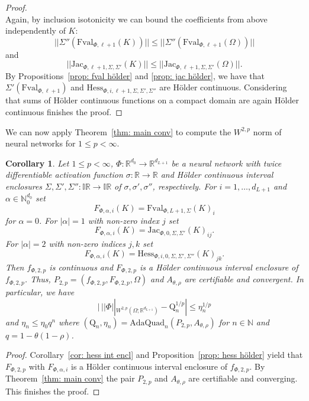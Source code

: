 \documentclass[a4paper, 11pt]{article}
\newtheorem{corollary}[theorem]{Corollary}
\begin{document}
\begin{proof}
\begin{equation*}
		\end{equation*}
		Again, by inclusion isotonicity we can bound the coefficients from above independently of $K$:
		$$ || \Sigma'' (\mathrm{Fval}_{\Phi, {\ell}+1}({K}))|| \leq || \Sigma'' (\mathrm{Fval}_{\Phi, {\ell}+1}({\Omega}))|| $$
		and 
		$$ || \mathrm{Jac}_{\Phi, {\ell}+1, \Sigma, \Sigma'}({K})|| \leq || \mathrm{Jac}_{\Phi, {\ell}+1, \Sigma, \Sigma'}({\Omega})||.$$
		By Propositions~\ref{prop: fval hölder} and \ref{prop: jac hölder}, we have that $\Sigma'(\mathrm{Fval}_{\Phi,\ell+1})$ and $\mathrm{Hess}_{\Phi, i,{\ell}+1, \Sigma, \Sigma', \Sigma''}$ are Hölder continuous. Considering that sums of Hölder continuous functions on a compact domain are again Hölder continuous finishes the proof.    
	\end{proof}
	
	
	We can now apply Theorem~\ref{thm: main conv} to compute the $W^{2,p}$ norm of neural networks for $1\leq p < \infty$.
	
	\begin{corollary}\label{corr:mainW2p}
		Let $1\leq p < \infty$, $\Phi : \mathbb{R}^{d_0} \to \mathbb{R}^{d_{L+1}}$ be a neural network with twice differentiable activation function $\sigma : \mathbb{R} \to \mathbb{R}$ and Hölder continuous interval enclosures $\Sigma,\Sigma',\Sigma'':\mathbb{IR}\to \mathbb{IR}$ of $\sigma,\sigma',\sigma''$, respectively.
		For $i=1, \dotsc, d_{L+1}$ and $\alpha \in\mathbb{N}^{d_0}_0$ set
		$$ F_{\Phi,\alpha,i}(K) = \mathrm{Fval}_{\Phi, L+1, \Sigma}(K)_i$$
		for $\alpha = 0$.
		For $|\alpha|=1$ with non-zero index $j$ set
		$$ F_{\Phi,\alpha,i}(K) = \mathrm{Jac}_{\Phi,0, \Sigma, \Sigma'}(K)_{ij}.$$
		For $|\alpha|=2$ with non-zero indices $j,k$
		set
		$$ F_{\Phi,\alpha,i}(K) = \mathrm{Hess}_{\Phi,i,0, \Sigma, \Sigma',\Sigma''}(K)_{jk}.$$
		Then $f_{\Phi,2,p}$ is continuous and $F_{\Phi,2,p}$ is a Hölder continuous interval enclosure of $f_{\Phi,2,p}$. Thus, $P_{2,p}=(f_{\Phi, 2,p}, F_{\Phi, 2,p}, \Omega)$ and $A_{\theta, \rho}$ are certifiable and convergent. In particular, we have
		$$ |\, ||\Phi||_{W^{2,p}(\Omega; \mathbb{R}^{d_{L+1}})} - \mathrm{Q}_n^{1/p}| \leq \eta_n^{1/p} $$
		and $\eta_n \leq \eta_0 q^n$ where $(\mathrm{Q}_n, \eta_n) = \mathrm{AdaQuad}_n(P_{2,p}, A_{\theta, \rho})$ for $n\in \mathbb{N}$ and $q=1-\theta(1-\rho)$.
	\end{corollary}
	\begin{proof}
		Corollary~\ref{cor: hess int encl} and Proposition~\ref{prop: hess hölder} yield that $F_{\Phi,2,p}$ with $F_{\Phi,\alpha,i}$ is a Hölder continuous interval enclosure of $f_{\Phi,2,p}$. By Theorem~\ref{thm: main conv} the pair $P_{2,p}$ and $A_{\theta,\rho}$ are certifiable and converging. This finishes the proof.
	\end{proof}
	
\end{document}
